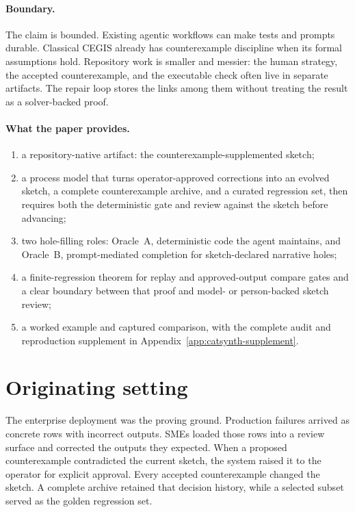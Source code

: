 \documentclass[11pt]{article}
\begin{document}
\paragraph{Boundary.}
The claim is bounded.  Existing agentic workflows can make tests and prompts
durable.  Classical CEGIS already has counterexample discipline when its formal assumptions
hold.  Repository work is smaller and messier: the human strategy, the accepted
counterexample, and the executable check often live in separate artifacts.  The repair loop
stores the links among them without treating the result as a solver-backed proof.

\paragraph{What the paper provides.}
\begin{enumerate}
  \item a repository-native artifact: the counterexample-supplemented sketch;
  \item a process model that turns operator-approved corrections into an evolved sketch, a
        complete counterexample archive, and a curated regression set, then requires both the
        deterministic gate and review against the sketch before advancing;
  \item two hole-filling roles: Oracle~A, deterministic code the agent maintains, and
        Oracle~B, prompt-mediated completion for sketch-declared narrative holes;
  \item a finite-regression theorem for replay and approved-output compare gates and a clear boundary
        between that proof and model- or person-backed sketch review;
  \item a worked example and captured comparison, with the complete audit and reproduction
        supplement in Appendix~\ref{app:catsynth-supplement}.
\end{enumerate}

\section{Originating setting}
\label{sec:originating-setting}

The enterprise deployment was the proving ground.  Production failures arrived as concrete rows
with incorrect outputs.  SMEs loaded those rows into a review surface and corrected the outputs
they expected.  When a proposed counterexample contradicted the current sketch, the system raised
it to the operator for explicit approval.  Every accepted counterexample changed the sketch.  A
complete archive retained that decision history, while a selected subset served as the golden
regression set.
\end{document}
